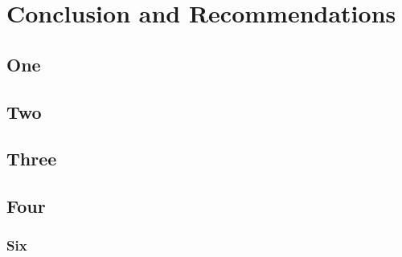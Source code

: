 
\chapter{Conclusion and Recommendations}

\section{One}

\section{Two}

\section{Three}

\section{Four}

\subsection{Six}


\newpage
